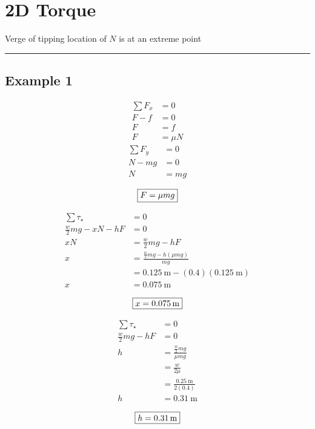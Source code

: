\documentclass{article}
\begin{document}
\newcommand{\hr}{\par\noindent\rule{\textwidth}{0.4pt}}

\newcommand{\bc}[1]{
	\begin{equation*}
		\begin{boxed}
			{#1}
		\end{boxed}
	\end{equation*}
}

\section{2D Torque}
Verge of tipping location of $ N $ is at an extreme point

\hr

\subsection{Example 1} \label{example:1}
\begin{align}
	\sum F_x & = 0 \\
	F - f & = 0 \\
	F & = f \\
	F & = \mu N
\end{align}
\begin{align}
	\sum F_y & = 0 \\
	N - mg & = 0 \\
	N & = mg
\end{align}
\bc{ F = \mu mg }
\begin{align}
	\sum \tau_\star & = 0 \\
	\frac{w}{2}mg - xN - hF & = 0 \\
	xN & = \frac{w}{2}mg - hF \\
	x & = \frac{ \frac{w}{s}mg - h(\mu mg) }{mg} \\
	  & = \SI{0.125}{\meter} - (0.4)(\SI{0.125}{\meter}) \\
	x & = \SI{0.075}{\meter}
\end{align}
\bc{x = \SI{0.075}{\meter}}
\begin{align}
	\sum \tau_\star & = 0 \\
	\frac{w}{2}mg - hF & = 0 \\
		h & = \frac{ \frac{w}{2}mg }{\mu mg} \\
		  & = \frac{w}{2\mu} \\
		  & = \frac{\SI{0.25}{\meter}}{2(0.4)} \\
		h & = \SI{0.31}{\meter}
\end{align}
\bc{h = \SI{0.31}{\meter}}
\end{document}
